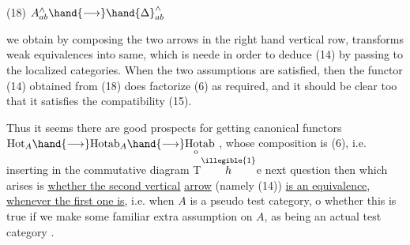 
(18) \qquad $A^{\wedge}_{ab} \hand{\longrightarrow} \hand{\Delta}^{\wedge}_{ab}$

we obtain by composing the two arrows in the right hand vertical row,
transforms weak equivalences into same, which is neede in order to
deduce  (14) by passing to the localized categories. When the two
assumptions are satisfied, then the functor (14) obtained from (18)
does factorize (6) as required, and it should be clear too that it
satisfies the compatibility (15).

Thus it seems there are good prospects for getting canonical
functors
 \qquad $\mathrm{Hot}_{A} \hand{\longrightarrow} \mathrm{Hotab}_{A} \hand{\longrightarrow} \mathrm{H}\underset{\mathrm{o}}{\mathrm{o}}\mathrm{tab}$ \quad ,
whose composition is (6), i.e. inserting in the commutative diagram
T$\overset{\illegible{1}}{h}$e next question then which arises is \uline{whether the second vertical}
\uline{arrow} (namely (14)) \uline{is an equivalence}, \uline{whenever the first one is}, i.e.
when $A$ is a pseudo test category, o whether this is true if we make
some familiar extra assumption on $A$,  as being an actual test category .

